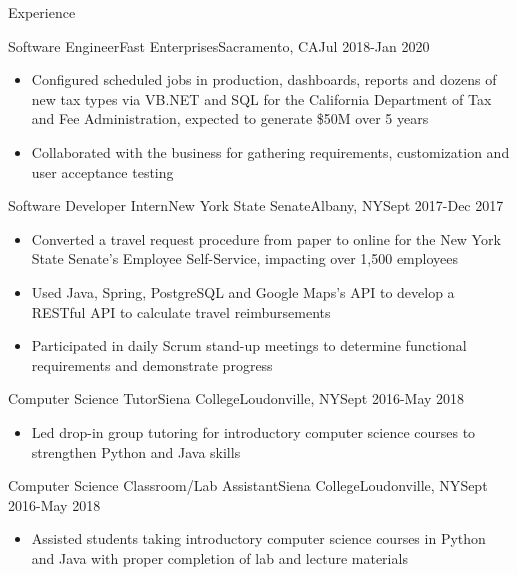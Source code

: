 \documentclass[]{xjavathehutt}
\begin{document}
\makeheader


\begin{cvsection}{Experience}
  \begin{cvsubsectionstart}{Software Engineer}{Fast Enterprises}{Sacramento, CA}{Jul 2018-Jan 2020}
    \begin{itemize}
      \item{Configured scheduled jobs in production, dashboards, reports and dozens of new tax
          types via VB.NET and SQL for the California Department of Tax and Fee Administration,
          expected to generate \$50M over 5 years}
      \item{Collaborated with the business for gathering requirements, customization and user
          acceptance testing}
    \end{itemize}
  \end{cvsubsectionstart}

  \begin{cvsubsection}{Software Developer Intern}{New York State Senate}{Albany, NY}{Sept 2017-Dec 2017}
    \begin{itemize}
      \item{Converted a travel request procedure from paper to online for the New York
        State Senate's Employee Self-Service, impacting over 1,500 employees}
      \item{Used Java, Spring, PostgreSQL and Google Maps's API to develop a RESTful API to
        calculate travel reimbursements}
      \item{Participated in daily Scrum stand-up meetings to determine functional requirements and
        demonstrate progress}
    \end{itemize}
  \end{cvsubsection}

  \begin{cvsubsection}{Computer Science Tutor}{Siena College}{Loudonville, NY}{Sept 2016-May 2018}
    \begin{itemize}
      \item{Led drop-in group tutoring for introductory computer science courses to strengthen
        Python and Java skills}
    \end{itemize}
  \end{cvsubsection}

  \begin{cvsubsection}{Computer Science Classroom/Lab Assistant}{Siena College}{Loudonville, NY}{Sept 2016-May 2018}
    \begin{itemize}
      \item{Assisted students taking introductory computer science courses in Python and Java with
        proper completion of lab and lecture materials}
    \end{itemize}
  \end{cvsubsection}


\end{cvsection}
\end{document}
